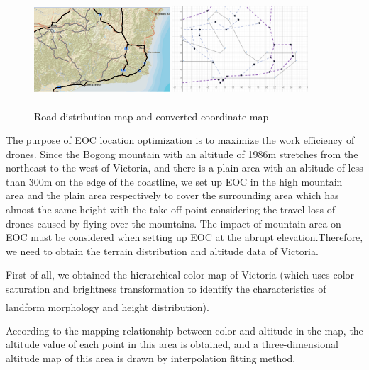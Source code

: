 \documentclass{mcmthesis}
\newcommand{\upcite}[1]{\textsuperscript{\textsuperscript{\cite{#1}}}}
\begin{document}
\begin{figure}[H]
  \centering
  {
  \includegraphics[width=0.45\textwidth]{image/2.png} 
  }
  {
  \includegraphics[width=0.45\textwidth]{image/3.png}
  }
  \caption{Road distribution map and converted coordinate map\upcite{fire_website}
  }
  \label{png1}
\end{figure}


The purpose of EOC location optimization is to maximize the work efficiency of drones. Since the Bogong mountain with an altitude of 1986m stretches from the northeast to the west of Victoria, and there is a plain area with an altitude of less than 300m on the edge of the coastline, we set up EOC in the high mountain area and the plain area respectively to cover the surrounding area which has almost the same height with the take-off point considering the travel loss of drones caused by flying over the mountains. The impact of mountain area on EOC must be considered when setting up EOC at the abrupt elevation.Therefore, we need to obtain the terrain distribution and altitude data of Victoria.

First of all, we obtained the hierarchical color map of Victoria (which uses color saturation and brightness transformation to identify the characteristics of landform morphology and height distribution\upcite{c_height}).

According to the mapping relationship between color and altitude in the map, the altitude value of each point in this area is obtained, and a three-dimensional altitude map of this area is drawn by interpolation fitting method.
\end{document}
